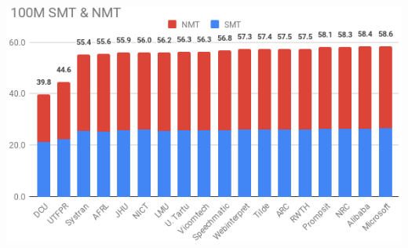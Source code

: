 \documentclass[a0]{sciposter}
\begin{document}
\begin{multicols*}{2}
\includegraphics[width=\columnwidth]{assets/100M_crop.png}



\end{multicols*}
\end{document}
